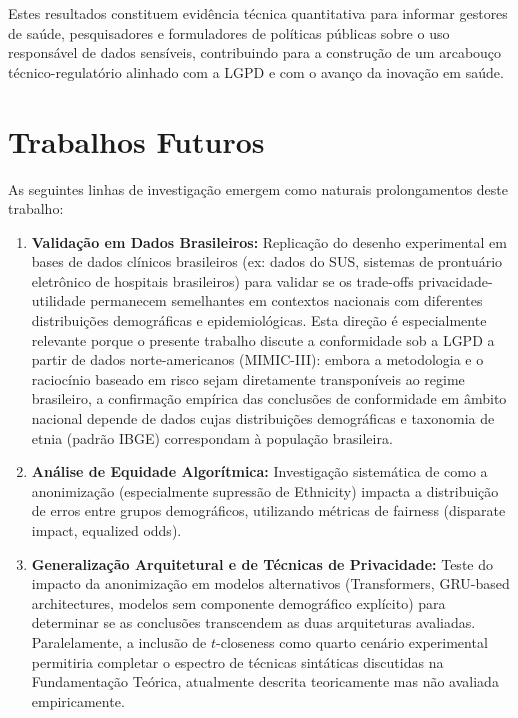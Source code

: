 Estes resultados constituem evidência técnica quantitativa para informar gestores de saúde, pesquisadores e formuladores de políticas públicas sobre o uso responsável de dados sensíveis, contribuindo para a construção de um arcabouço técnico-regulatório alinhado com a LGPD e com o avanço da inovação em saúde.

\section{Trabalhos Futuros}
\label{sec:conclusao-futuros}

As seguintes linhas de investigação emergem como naturais prolongamentos deste trabalho:

\begin{enumerate}
    \item \textbf{Validação em Dados Brasileiros:} Replicação do desenho experimental em bases de dados clínicos brasileiros (ex: dados do SUS, sistemas de prontuário eletrônico de hospitais brasileiros) para validar se os trade-offs privacidade-utilidade permanecem semelhantes em contextos nacionais com diferentes distribuições demográficas e epidemiológicas. Esta direção é especialmente relevante porque o presente trabalho discute a conformidade sob a LGPD a partir de dados norte-americanos (MIMIC-III): embora a metodologia e o raciocínio baseado em risco sejam diretamente transponíveis ao regime brasileiro, a confirmação empírica das conclusões de conformidade em âmbito nacional depende de dados cujas distribuições demográficas e taxonomia de etnia (padrão IBGE) correspondam à população brasileira.
    
    \item \textbf{Análise de Equidade Algorítmica:} Investigação sistemática de como a anonimização (especialmente supressão de Ethnicity) impacta a distribuição de erros entre grupos demográficos, utilizando métricas de fairness (disparate impact, equalized odds).
    
    \item \textbf{Generalização Arquitetural e de Técnicas de Privacidade:} Teste do impacto da anonimização em modelos alternativos (Transformers, GRU-based architectures, modelos sem componente demográfico explícito) para determinar se as conclusões transcendem as duas arquiteturas avaliadas. Paralelamente, a inclusão de $t$-closeness como quarto cenário experimental permitiria completar o espectro de técnicas sintáticas discutidas na Fundamentação Teórica, atualmente descrita teoricamente mas não avaliada empiricamente.
    

\end{enumerate}
